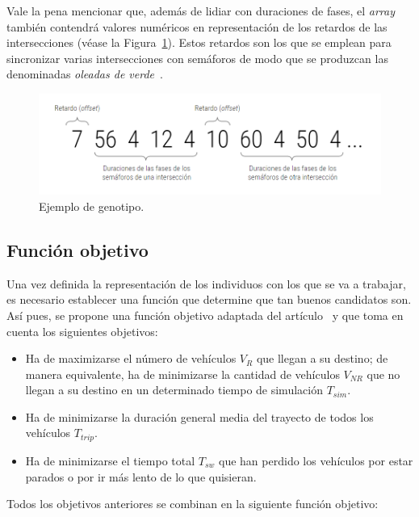 Vale la pena mencionar que, además de lidiar con duraciones de fases, el \textit{array} también contendrá valores numéricos en representación de los retardos de las intersecciones (véase la Figura~\ref{fig:genotipo}). Estos retardos son los que se emplean para sincronizar varias intersecciones con semáforos de modo que se produzcan las denominadas \textit{oleadas de verde}~\cite{segredo_optimising_2019}.


\begin{figure}[ht]
    \centering
    \includegraphics[width=\textwidth]{report/images/genotipo.png}
    \caption{Ejemplo de genotipo.}
    \label{fig:genotipo}
\end{figure}


\subsection{Función objetivo}
\label{subsec:funcion}

Una vez definida la representación de los individuos con los que se va a trabajar, es necesario establecer una función que determine que tan buenos candidatos son. Así pues, se propone una función objetivo adaptada del artículo~\cite{segredo_optimising_2019} y que toma en cuenta los siguientes objetivos:

\begin{itemize}
    \item Ha de maximizarse el número de vehículos $V_R$ que llegan a su destino; de manera equivalente, ha de minimizarse la cantidad de vehículos $V_{NR}$ que no llegan a su destino en un determinado tiempo de simulación $T_{sim}$.
    \item Ha de minimizarse la duración general media del trayecto de todos los vehículos $T_{trip}$.
    \item Ha de minimizarse el tiempo total $T_{sw}$ que han perdido los vehículos por estar parados o por ir más lento de lo que quisieran.
\end{itemize}

Todos los objetivos anteriores se combinan en la siguiente función objetivo:

